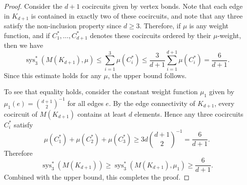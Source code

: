 \documentclass[10pt,a4paper]{amsart}
\DeclareMathOperator{\sys}{sys}
\begin{document}
\begin{proof}
Consider the $d + 1$ cocircuits given by vertex bonds. Note that each edge in $K_{d+1}$ is contained in exactly two of these cocircuits, and note that any three satisfy the non-inclusion property since $d \geq 3$. Therefore, if $\mu$ is any weight function, and if $C_1^*, \ldots, C_{d+1}^*$ denotes these cocircuits ordered by their $\mu$-weight, then we have
    \[\sys_3^*(M(K_{d+1}), \mu) \leq \sum_{i=1}^3 \mu(C_i^*) \leq \frac{3}{d+1} \sum_{i=1}^{d+1} \mu(C_i^*) = \frac{6}{d+1}.\]
Since this estimate holds for any $\mu$, the upper bound follows. 

To see that equality holds, consider the constant weight function $\mu_1$ given by $\mu_1(e) = \binom{d+1}{2}^{-1}$ for all edges $e$. By the edge connectivity of $K_{d+1}$, every cocircuit of $M(K_{d+1})$ contains at least $d$ elements. 
Hence any three cocircuits $C_i^*$ satisfy
    \[\mu(C_1^*) + \mu(C_2^*) + \mu(C_3^*) \geq 3d\binom{d+1}{2}^{-1} = \frac{6}{d+1}.\]
Therefore
    \[\sys_3^*(M(K_{d+1})) 
    \geq \sys_3^*(M(K_{d+1}), \mu_1) \geq  \frac{6}{d+1}.\] 
Combined with the upper bound, this completes the proof.
\end{proof}
\end{document}
